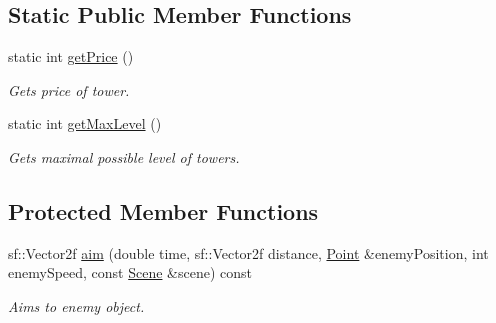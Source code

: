 \subsection*{Static Public Member Functions}
\begin{DoxyCompactItemize}
\item 
static int \mbox{\hyperlink{class_tower_a3b495235e7ca4a76c858d62ba1775aac}{get\+Price}} ()
\begin{DoxyCompactList}\small\item\em Gets price of tower. \end{DoxyCompactList}\item 
static int \mbox{\hyperlink{class_tower_ade2e2de32deefb5112473363911c6e73}{get\+Max\+Level}} ()
\begin{DoxyCompactList}\small\item\em Gets maximal possible level of towers. \end{DoxyCompactList}\end{DoxyCompactItemize}
\subsection*{Protected Member Functions}
\begin{DoxyCompactItemize}
\item 
sf\+::\+Vector2f \mbox{\hyperlink{class_tower_a1184d64afe39819372e94f8d0e678c7f}{aim}} (double time, sf\+::\+Vector2f distance, \mbox{\hyperlink{class_point}{Point}} \&enemy\+Position, int enemy\+Speed, const \mbox{\hyperlink{class_scene}{Scene}} \&scene) const
\begin{DoxyCompactList}\small\item\em Aims to enemy object. \end{DoxyCompactList}\end{DoxyCompactItemize}

